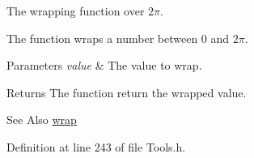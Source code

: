 The wrapping function over $2\pi$. 

The function wraps a number between 0 and $2\pi$.


\begin{DoxyParams}{Parameters}
{\em value} & The value to wrap. \\
\hline
\end{DoxyParams}
\begin{DoxyReturn}{Returns}
The function return the wrapped value.
\end{DoxyReturn}
\begin{DoxySeeAlso}{See Also}
\hyperlink{namespace_hoa3_d_a797e7afd706be7e4c1b5961214991f35}{wrap} 
\end{DoxySeeAlso}


Definition at line 243 of file Tools.\-h.

